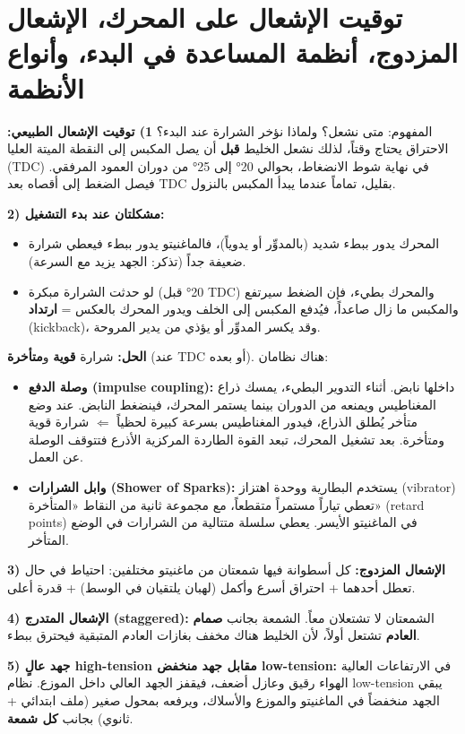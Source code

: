 \documentclass[11pt,a4paper]{article}
\newcommand{\en}[1]{\textenglish{#1}}
\begin{document}
\newpage
\section{توقيت الإشعال على المحرك، الإشعال المزدوج، أنظمة المساعدة في البدء، وأنواع الأنظمة}

\begin{concept}{المفهوم: متى نشعل؟ ولماذا نؤخر الشرارة عند البدء؟}
\textbf{1) توقيت الإشعال الطبيعي:} الاحتراق يحتاج وقتاً، لذلك نشعل الخليط \textbf{قبل} أن يصل المكبس إلى النقطة الميتة العليا (\en{TDC}) في نهاية شوط الانضغاط، بحوالي 20° إلى 25° من دوران العمود المرفقي. فيصل الضغط إلى أقصاه بعد \en{TDC} بقليل، تماماً عندما يبدأ المكبس بالنزول.

\textbf{2) مشكلتان عند بدء التشغيل:}
\begin{itemize}
  \item المحرك يدور ببطء شديد (بالمدوِّر أو يدوياً)، فالماغنيتو يدور ببطء فيعطي شرارة ضعيفة جداً (تذكر: الجهد يزيد مع السرعة).
  \item لو حدثت الشرارة مبكرة (20° قبل \en{TDC}) والمحرك بطيء، فإن الضغط سيرتفع والمكبس ما زال صاعداً، فيُدفع المكبس إلى الخلف ويدور المحرك بالعكس = \textbf{ارتداد} (\en{kickback})، وقد يكسر المدوِّر أو يؤذي من يدير المروحة.
\end{itemize}
\textbf{الحل:} شرارة \textbf{قوية} و\textbf{متأخرة} (عند \en{TDC} أو بعده). هناك نظامان:
\begin{itemize}
  \item \textbf{وصلة الدفع (\en{impulse coupling}):} داخلها نابض. أثناء التدوير البطيء، يمسك ذراع المغناطيس ويمنعه من الدوران بينما يستمر المحرك، فينضغط النابض. عند وضع متأخر يُطلق الذراع، فيدور المغناطيس بسرعة كبيرة لحظياً $\Leftarrow$ شرارة قوية ومتأخرة. بعد تشغيل المحرك، تبعد القوة الطاردة المركزية الأذرع فتتوقف الوصلة عن العمل.
  \item \textbf{وابل الشرارات (\en{Shower of Sparks}):} يستخدم البطارية ووحدة اهتزاز (\en{vibrator}) تعطي تياراً مستمراً متقطعاً، مع مجموعة ثانية من النقاط «المتأخرة» (\en{retard points}) في الماغنيتو الأيسر. يعطي سلسلة متتالية من الشرارات في الوضع المتأخر.
\end{itemize}

\textbf{3) الإشعال المزدوج:} كل أسطوانة فيها شمعتان من ماغنيتو مختلفين: احتياط في حال تعطل أحدهما + احتراق أسرع وأكمل (لهبان يلتقيان في الوسط) + قدرة أعلى.

\textbf{4) الإشعال المتدرج (\en{staggered}):} الشمعتان لا تشتعلان معاً. الشمعة بجانب \textbf{صمام العادم} تشتعل أولاً، لأن الخليط هناك مخفف بغازات العادم المتبقية فيحترق ببطء.

\textbf{5) جهد عالٍ \en{high-tension} مقابل جهد منخفض \en{low-tension}:} في الارتفاعات العالية الهواء رقيق وعازل أضعف، فيقفز الجهد العالي داخل الموزع. نظام \en{low-tension} يبقي الجهد منخفضاً في الماغنيتو والموزع والأسلاك، ويرفعه بمحول صغير (ملف ابتدائي + ثانوي) بجانب \textbf{كل شمعة}.
\end{concept}
\end{document}
